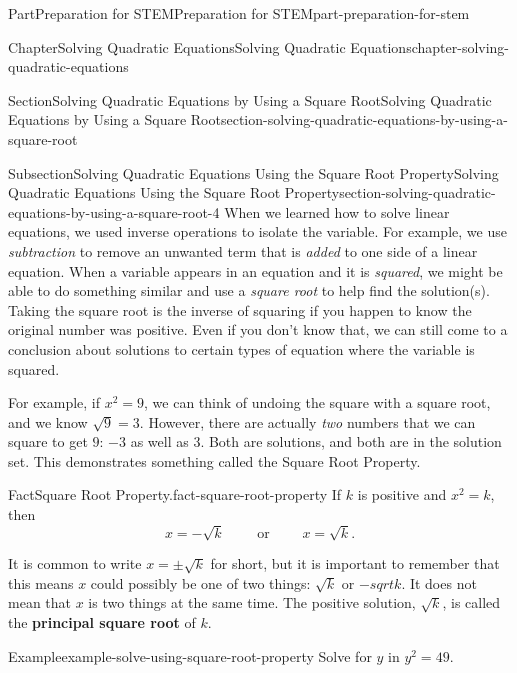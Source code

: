 \documentclass[twoside,10pt,]{book}
\newcommand{\terminology}[1]{\textbf{#1}}
\numberwithin{equation}{section}
\begin{document}
\begin{partptx}{Part}{Preparation for STEM}{}{Preparation for STEM}{}{}{part-preparation-for-stem}
\begin{chapterptx}{Chapter}{Solving Quadratic Equations}{}{Solving Quadratic Equations}{}{}{chapter-solving-quadratic-equations}
\begin{sectionptx}{Section}{Solving Quadratic Equations by Using a Square Root}{}{Solving Quadratic Equations by Using a Square Root}{}{}{section-solving-quadratic-equations-by-using-a-square-root}
\begin{introduction}{}
\end{introduction}%
%
%
\typeout{************************************************}
\typeout{************************************************}
%
\begin{subsectionptx}{Subsection}{Solving Quadratic Equations Using the Square Root Property}{}{Solving Quadratic Equations Using the Square Root Property}{}{}{section-solving-quadratic-equations-by-using-a-square-root-4}
%
When we learned how to solve linear equations, we used inverse operations to isolate the variable. For example, we use \emph{subtraction} to remove an unwanted term that is \emph{added} to one side of a linear equation. When a variable appears in an equation and it is \emph{squared}, we might be able to do something similar and use a \emph{square root} to help find the solution(s). Taking the square root is the inverse of squaring if you happen to know the original number was positive. Even if you don't know that, we can still come to a conclusion about solutions to certain types of equation where the variable is squared.%
\par
For example, if \(x^2=9\), we can think of undoing the square with a square root, and we know \(\sqrt{9}=3\). However, there are actually \emph{two} numbers that we can square to get \(9\): \(-3\) as well as \(3\). Both are solutions, and both are in the solution set. This demonstrates something called the Square Root Property.%
\begin{fact}{Fact}{Square Root Property.}{}{fact-square-root-property}%
%
%
If \(k\) is positive and \(x^2=k\), then%
\begin{equation*}
x=-\sqrt{k}\qquad\text{ or }\qquad x=\sqrt{k}\text{.}
\end{equation*}
%
\par
It is common to write \(x=\pm\sqrt{k}\) for short, but it is important to remember that this means \(x\) could possibly be one of two things: \(\sqrt{k}\) or \(-sqrt{k}\). It does not mean that \(x\) is two things at the same time. The positive solution, \(\sqrt{k}\), is called the \terminology{principal square root} of \(k\).%
\end{fact}
\begin{example}{Example}{}{example-solve-using-square-root-property}%
Solve for \(y\) in \(y^2=49\).%
\par\smallskip%

\end{example}
\end{subsectionptx}
\end{sectionptx}
\end{chapterptx}
\end{partptx}
\end{document}
